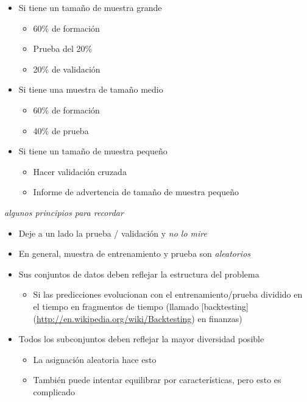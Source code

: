 \documentclass[
]{article}
\providecommand{\tightlist}{%
  \setlength{\itemsep}{0pt}\setlength{\parskip}{0pt}}
\begin{document}
\begin{itemize}
\tightlist
\item
  Si tiene un tamaño de muestra grande

  \begin{itemize}
  \tightlist
  \item
    60\% de formación
  \item
    Prueba del 20\%
  \item
    20\% de validación
  \end{itemize}
\item
  Si tiene una muestra de tamaño medio

  \begin{itemize}
  \tightlist
  \item
    60\% de formación
  \item
    40\% de prueba
  \end{itemize}
\item
  Si tiene un tamaño de muestra pequeño

  \begin{itemize}
  \tightlist
  \item
    Hacer validación cruzada
  \item
    Informe de advertencia de tamaño de muestra pequeño
  \end{itemize}
\end{itemize}

\emph{algunos principios para recordar}

\begin{itemize}
\tightlist
\item
  Deje a un lado la prueba / validación y \emph{no lo mire}
\item
  En general, muestra de entrenamiento y prueba son \emph{aleatorios}
\item
  Sus conjuntos de datos deben reflejar la estructura del problema

  \begin{itemize}
  \tightlist
  \item
    Si las predicciones evolucionan con el entrenamiento/prueba dividido
    en el tiempo en fragmentos de tiempo (llamado {[}backtesting{]}
    (\url{http://en.wikipedia.org/wiki/Backtesting}) en finanzas)
  \end{itemize}
\item
  Todos los subconjuntos deben reflejar la mayor diversidad posible

  \begin{itemize}
  \tightlist
  \item
    La asignación aleatoria hace esto
  \item
    También puede intentar equilibrar por características, pero esto es
    complicado
  \end{itemize}
\end{itemize}
\end{document}
